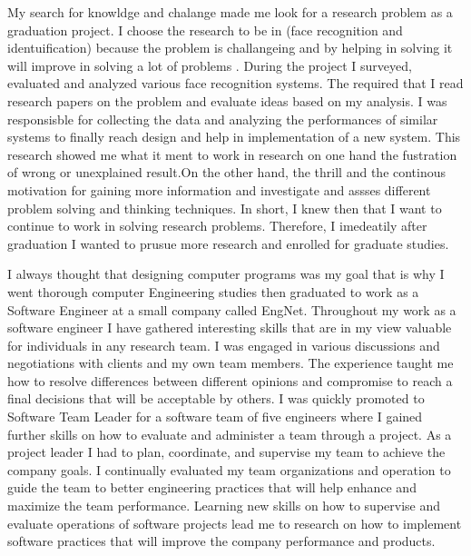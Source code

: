 \documentclass[a4paper,12pt]{article}%
\begin{document}
  My search for knowldge and chalange made me look for a research problem as a graduation project. I choose the research to be in (face recognition and identuification) because the problem is challangeing and by helping in solving it will improve in solving a lot of problems . During the project I  surveyed, evaluated and analyzed various face recognition systems. The required that I read research papers on the problem and evaluate ideas based on my analysis. I was responsisble for collecting the data and analyzing the performances of similar systems to finally reach design and help in implementation of a new system. This research showed me what it ment to work in research on one hand the fustration of wrong or unexplained result.On the other hand, the thrill and the continous motivation for gaining more information and investigate and assses different problem solving and thinking techniques. In short, I knew then that I want to continue to work in solving research problems. Therefore, I imedeatily after graduation I wanted to prusue more research and enrolled for graduate studies.
  
I always thought that designing computer programs was my goal that is why I went thorough computer Engineering studies then graduated to work as a Software Engineer at a small company called EngNet. Throughout my work as a software engineer I have gathered interesting skills that are in my view valuable for individuals in any research team.  I was engaged in various discussions and negotiations with clients and my own team members. The experience taught me how to resolve differences between different opinions and compromise to reach a final decisions that will be acceptable by others. I was quickly promoted to Software Team Leader for a software team of five engineers  where I gained further skills on how to  evaluate and administer a team through a project. As a project leader I had to plan, coordinate, and  supervise my team to achieve the company goals. I continually evaluated my team organizations and operation to guide the team to better engineering practices that will help enhance and maximize the team performance.  Learning new skills on how to supervise and evaluate operations of software projects lead me to research on how to implement software practices that will improve the company performance and products. 
 
\end{document}
